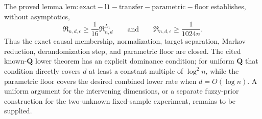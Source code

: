 The proved lemma \(\mathrm{lem:exact-l1-transfer-parametric-floor}\) establishes, without asymptotics,
\[
 \mathfrak R_{n,d,\epsilon}\ge\frac1{16}\mathfrak R^{L_1}_{n,d}
 \qquad\text{and}\qquad
 \mathfrak R_{n,d,\epsilon}\ge\frac{1}{1024n}.
\]
Thus the exact causal membership, normalization, target separation, Markov reduction, derandomization step, and parametric floor are closed.  The cited known-\(\mathbf Q\) lower theorem has an explicit dominance condition; for uniform \(\mathbf Q\) that condition directly covers \(d\) at least a constant multiple of \(\log^2 n\), while the parametric floor covers the desired combined lower rate when \(d=O(\log n)\).  A uniform argument for the intervening dimensions, or a separate fuzzy-prior construction for the two-unknown fixed-sample experiment, remains to be supplied.